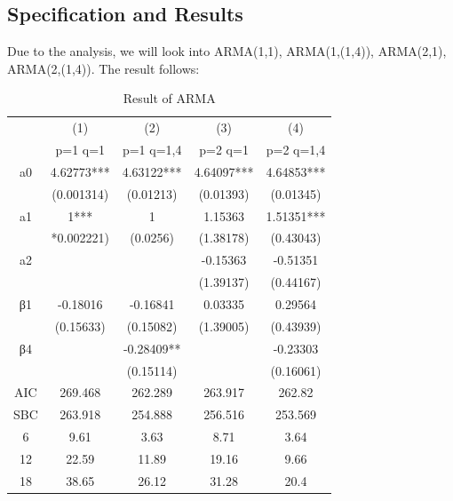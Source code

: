 \documentclass{article}
\begin{document}
\subsection{Specification and Results}
Due to the analysis, we will look into ARMA(1,1), ARMA(1,(1,4)), ARMA(2,1), ARMA(2,(1,4)). The result follows:
\begin{table}[!ht]
\centering
\begin{tabular}{ccccc}
\hline
\hline
           &        (1) &        (2) &        (3) &        (4) \\

           &    p=1 q=1 &  p=1 q=1,4 &    p=2 q=1 &  p=2 q=1,4 \\
\hline
        a0 & 4.62773*** & 4.63122*** & 4.64097*** & 4.64853*** \\

           &   (0.001314) &    (0.01213) &    (0.01393) &    (0.01345) \\

        a1 &       1*** &          1 &    1.15363 & 1.51351*** \\

           &   *0.002221) &     (0.0256) &    (1.38178) &    (0.43043) \\

        a2 &            &            &   -0.15363 &   -0.51351 \\

           &            &            &    (1.39137) &    (0.44167) \\

        β1 &   -0.18016 &   -0.16841 &    0.03335 &    0.29564 \\

           &    (0.15633) &    (0.15082) &    (1.39005) &    (0.43939) \\

        β4 &            & -0.28409** &            &   -0.23303 \\

           &            &    (0.15114) &            &    (0.16061) \\
\hline
       AIC &    269.468 &    262.289 &    263.917 &    262.82 \\

       SBC &    263.918 &    254.888 &    256.516 &    253.569 \\

         6 &       9.61 &       3.63 &       8.71 &      3.64 \\

        12 &      22.59 &      11.89 &      19.16 &      9.66 \\

        18 &      38.65 &      26.12 &      31.28 &      20.4 \\
\hline
\hline
\end{tabular}  
\caption{Result of ARMA}
\end{table}
\end{document}
